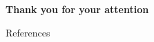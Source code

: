 \documentclass[18pt]{beamer}
\begin{document}
\begin{frame}{\vphantom{A}}
\centering
{\LARGE \textbf{Thank you for your attention}}
\end{frame}


%
%
%

\appendix
\beginbackup

\nocite{*}
\begin{frame}[allowframebreaks]{References}
\printbibliography
\end{frame}

\backupend
\end{document}
